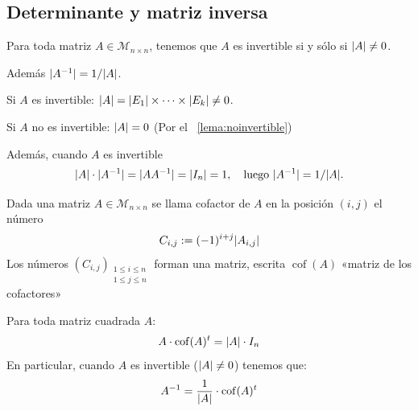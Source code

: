 \documentclass[11pt,a4paper]{article}
\newcommand{\M}{\mathcal{M}}
\DeclareMathOperator{\cof}{cof}
\begin{document}
\subsection{Determinante y matriz inversa}

\begin{teorema}
Para toda matriz $A\in\M_{n\times n}$, tenemos que $A$ es invertible si y sólo si $\lvert A\rvert\neq0$.

Además $\lvert A^{-1}\rvert=1/\lvert A\rvert$.
\end{teorema}

\begin{demo}
Si $A$ es invertible: $\lvert A\rvert=\lvert E_1\rvert\times\dots\times\lvert E_k\rvert\neq0$.

Si $A$ no es invertible: $\lvert A\rvert=0$ (Por el ~\ref{lema:noinvertible})

Además, cuando $A$ es invertible
\[
\lvert A\rvert\cdot\lvert A^{-1}\rvert=\lvert AA^{-1}\rvert=\lvert I_n\rvert=1,\quad\text{luego } \lvert A^{-1}\rvert=1/\lvert A\rvert.
\]
\end{demo}

\begin{definicion}
Dada una matriz $A\in\M_{n\times n}$ se llama cofactor de $A$ en la posición $(i,j)$ el número
\[
C_{i,j}:=(-1)^{i+j}\lvert A_{i,j}\rvert
\]
Los números $(C_{i,j})_{\substack{1\leq i\leq n\\1\leq j\leq n}}$ forman una matriz, escrita $\cof(A)$ \hfill «matriz de los cofactores»
\end{definicion}

\begin{teorema}
Para toda matriz cuadrada $A$:
\[
A\cdot\cof(A)^t=\abs{A}\cdot I_n
\]
En particular, cuando $A$ es invertible ($\lvert A\rvert\neq0$) tenemos que:
\[
A^{-1}=\frac{1}{\abs{A}}\cdot\cof(A)^t
\]
\end{teorema}

\end{document}
